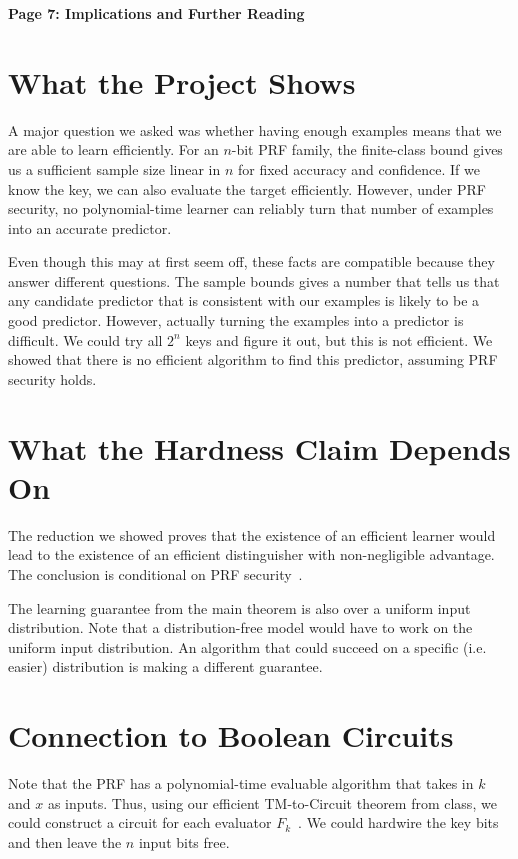 \documentclass[11pt,fleqn]{article}
\begin{document}
\raggedright
\setlength{\parskip}{0.6em}

{\LARGE\bfseries Page 7: Implications and Further Reading\par}
\medskip

\section{What the Project Shows}

A major question we asked was whether having enough examples means that we are able to learn efficiently. For an $n$-bit PRF family, the finite-class bound gives us a sufficient sample size linear in $n$ for fixed accuracy and confidence. If we know the key, we can also evaluate the target efficiently. However, under PRF security, no polynomial-time learner can reliably turn that number of examples into an accurate predictor.

Even though this may at first seem off, these facts are compatible because they answer different questions. The sample bounds gives a number that tells us that any candidate predictor that is consistent with our examples is likely to be a good predictor. However, actually turning the examples into a predictor is difficult. We could try all $2^n$ keys and figure it out, but this is not efficient. We showed that there is no efficient algorithm to find this predictor, assuming PRF security holds.

\section{What the Hardness Claim Depends On}

The reduction we showed proves that the existence of an efficient learner would lead to the existence of an efficient distinguisher with non-negligible advantage. The conclusion is conditional on PRF security~\cite{mit}.

The learning guarantee from the main theorem is also over a uniform input distribution. Note that a distribution-free model would have to work on the uniform input distribution. An algorithm that could succeed on a specific (i.e. easier) distribution is making a different guarantee.

\section{Connection to Boolean Circuits}

Note that the PRF has a polynomial-time evaluable algorithm that takes in $k$ and $x$ as inputs. Thus, using our efficient TM-to-Circuit theorem from class, we could construct a circuit for each evaluator $F_k$~\cite{circuits}. We could hardwire the key bits and then leave the $n$ input bits free.
\end{document}
